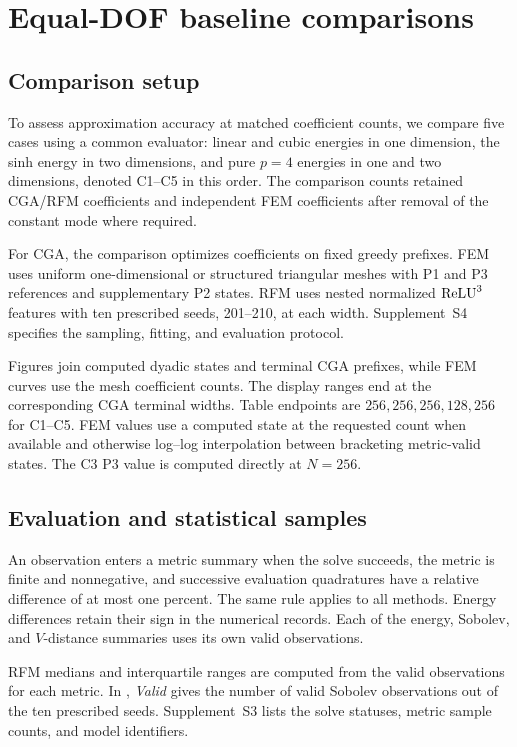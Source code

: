 \section{Equal-DOF baseline comparisons}
\label{sec:results}

\subsection{Comparison setup}

To assess approximation accuracy at matched coefficient counts, we compare five cases using a common evaluator: linear and cubic energies in one dimension, the sinh energy in two dimensions, and pure \(p=4\) energies in one and two dimensions, denoted C1--C5 in this order. The comparison counts retained CGA/RFM coefficients and independent FEM coefficients after removal of the constant mode where required.

For CGA, the comparison optimizes coefficients on fixed greedy prefixes. FEM uses uniform one-dimensional or structured triangular meshes with P1 and P3 references and supplementary P2 states. RFM uses nested normalized \(\operatorname{ReLU}^3\) features with ten prescribed seeds, 201--210, at each width. Supplement~S4 specifies the sampling, fitting, and evaluation protocol.

Figures join computed dyadic states and terminal CGA prefixes, while FEM curves use the mesh coefficient counts. The display ranges end at the corresponding CGA terminal widths. Table endpoints are \(256,256,256,128,256\) for C1--C5. FEM values use a computed state at the requested count when available and otherwise log--log interpolation between bracketing metric-valid states. The C3 P3 value is computed directly at \(N=256\).

\subsection{Evaluation and statistical samples}

An observation enters a metric summary when the solve succeeds, the metric is finite and nonnegative, and successive evaluation quadratures have a relative difference of at most one percent. The same rule applies to all methods. Energy differences retain their sign in the numerical records. Each of the energy, Sobolev, and \(V\)-distance summaries uses its own valid observations.

RFM medians and interquartile ranges are computed from the valid observations for each metric. In , \emph{Valid} gives the number of valid Sobolev observations out of the ten prescribed seeds. Supplement~S3 lists the solve statuses, metric sample counts, and model identifiers.

